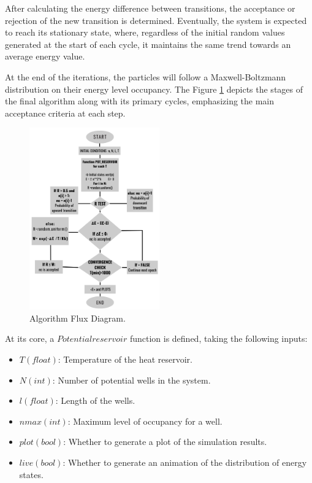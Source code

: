 \documentclass[%
 reprint,
 amsmath,amssymb,
 aps,
]{revtex4-2}
\begin{document}
After calculating the energy difference between transitions, the acceptance or rejection of the new transition is determined. Eventually, the system is expected to reach its stationary state, where, regardless of the initial random values generated at the start of each cycle, it maintains the same trend towards an average energy value. \par
At the end of the iterations, the particles will follow a Maxwell-Boltzmann distribution on their energy level occupancy. The Figure \ref{fig:flux} depicts the stages of the final algorithm along with its primary cycles, emphasizing the main acceptance criteria at each step.

\begin{figure}[h]
    \centering
    \includegraphics[width=0.5\textwidth]{diagflux.png} 
    \caption{Algorithm Flux Diagram.}
    \label{fig:flux}
\end{figure}

At its core, a $Potentialreservoir$ function is defined, taking the following inputs: 

\begin{itemize}
    \item $T (float)$: Temperature of the heat reservoir. 
    \item $N (int)$: Number of potential wells in the system.
    \item $l (float)$: Length of the wells.
    \item $nmax (int)$: Maximum level of occupancy for a well.
    \item $plot (bool)$: Whether to generate a plot of the simulation results.
    \item $live (bool)$: Whether to generate an animation of the distribution of energy states.    

\end{itemize}  
\end{document}
